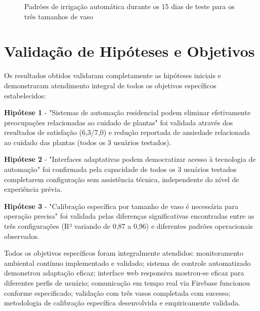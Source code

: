 \begin{figure}[htbp]
\centering
\caption{Padrões de irrigação automática durante os 15 dias de teste para os três tamanhos de vaso}
\label{fig:padroes_irrigacao}
\end{figure}

\section{Validação de Hipóteses e Objetivos}

Os resultados obtidos validaram completamente as hipóteses iniciais e demonstraram atendimento integral de todos os objetivos específicos estabelecidos:

\textbf{Hipótese 1} - "Sistemas de automação residencial podem eliminar efetivamente preocupações relacionadas ao cuidado de plantas" foi validada através dos resultados de satisfação (6,3/7,0) e redução reportada de ansiedade relacionada ao cuidado das plantas (todos os 3 usuários testados).

\textbf{Hipótese 2} - "Interfaces adaptativas podem democratizar acesso à tecnologia de automação" foi confirmada pela capacidade de todos os 3 usuários testados completarem configuração sem assistência técnica, independente do nível de experiência prévia.

\textbf{Hipótese 3} - "Calibração específica por tamanho de vaso é necessária para operação precisa" foi validada pelas diferenças significativas encontradas entre as três configurações (R² variando de 0,87 a 0,96) e diferentes padrões operacionais observados.

Todos os objetivos específicos foram integralmente atendidos: monitoramento ambiental contínuo implementado e validado; sistema de controle automatizado demonstrou adaptação eficaz; interface web responsiva mostrou-se eficaz para diferentes perfis de usuário; comunicação em tempo real via Firebase funcionou conforme especificado; validação com três vasos completada com sucesso; metodologia de calibração específica desenvolvida e empiricamente validada.

